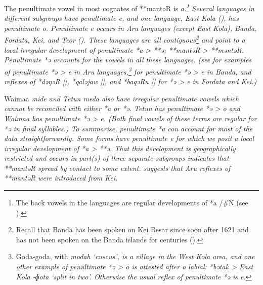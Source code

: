 The penultimate vowel in most cognates of **mantəR is \it{a}.\footnote{
		The back vowels in the  languages
		are regular developments of *a /{\#}N{\gap} (see {}).}
Several languages in different subgroups have penultimate \it{e},
and one language, East Kola (), has penultimate \it{o}.
Penultimate \it{e} occurs in Aru languages (except East Kola),
Banda, Fordata, Kei, and Teor ().
These languages are all contiguous\footnote{
		Recall that Banda has been spoken on Kei Besar since soon after 1621
		and has not been spoken on the Banda islands for centuries ().}
and point to a local irregular development of penultimate *a
> **ə; **mantəR > **məntəR.
Penultimate *ə accounts for the vowels in all these languages.
(see  for examples of penultimate *ə > \it{e} in Aru
languages,\footnote{
		Goda-goda, with \it{modah} ‘cuscus’, is a village in the West Kola area,
		and one other example of penultimate *ə > \it{o} is attested
		after a labial: *bətak > East Kola -\it{ɸota} ‘split in two’.
		Otherwise the usual reflex of penultimate *ə is \it{e}.}
 for penultimate *ə > \it{e} in Banda,
and reflexes of *dəŋəR [],
*qaləjaw [], and *baqəRu [] for *ə > \it{e}
in Fordata and Kei.) 

Waima{\Q}a \it{mide} and Tetun \it{meda} also have irregular
penultimate vowels which cannot be reconciled with either *a or *ə.
Tetun has penultimate *ə > \it{o}
and Waima{\Q}a has penultimate *ə > \it{e}.
(Both final vowels of these terms are regular for *ə in final
syllables.) 
To summarise, penultimate *a can account for most of the data straightforwardly.
Some forms have penultimate \it{e} for which we posit a local
irregular development of *a > **ə.
That this development is geographically restricted
and occurs in part(s) of three separate subgroups indicates that
**mantəR spread by contact to some extent.
\citet[264]{Schapper2011} suggests that Aru reflexes of **mantəR
were introduced from Kei.